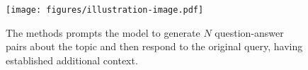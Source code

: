 \begin{figure}[t]
    \centering
    \texttt{[image: figures/illustration-image.pdf]}
    \caption{The \rephrase{} methods prompts the model to generate $N$ question-answer pairs about the topic and then respond to the original query, having established additional context.}
    \label{fig:illustration}
\end{figure}
